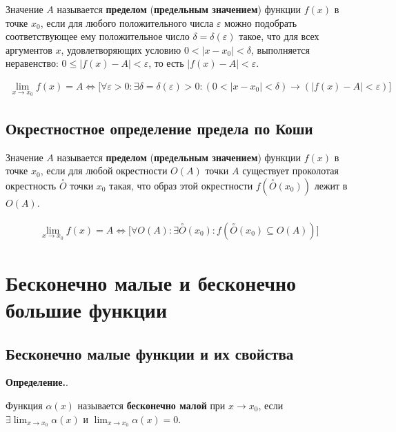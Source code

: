 \documentclass[a4paper,12pt]{extbook}
\newcommand{\newpar}{$ $\par\nobreak\ignorespaces}
\newenvironment{definition}[1][]{\noindent\textbf{Определение.}\if\relax\detokenize{#1}\relax\else\;#1.\newpar\fi\;}{\bigskip}
\theoremstyle{numbered}
\theoremstyle{named}
\theoremstyle{named}
\theoremstyle{named}
\begin{document}
Значение \(A\) называется \textbf{пределом} (\textbf{предельным значением}) функции \(f(x)\) в точке \(x_0\), если для любого положительного числа \(\varepsilon\) можно подобрать соответствующее ему положительное число \(\delta = \delta (\varepsilon)\) такое, что для всех аргументов \(x\), удовлетворяющих условию \(0 < |x - x_0| < \delta\), выполняется неравенство: \(0 \leq |f(x) - A| < \varepsilon\), то есть \(|f(x) -A| < \varepsilon\).

\begin{gather*}
    \lim_{x \to x_0}{f(x)} = A \iff \Big[ \forall \varepsilon > 0: \exists \delta = \delta (\varepsilon) > 0: (0 < |x - x_0| < \delta) \to (|f(x) - A| < \varepsilon) \Big]
\end{gather*}

\subsection*{Окрестностное определение предела по Коши}
Значение \(A\) называется \textbf{пределом} (\textbf{предельным значением}) функции \(f(x)\) в точке \(x_0\), если для любой окрестности \(O(A)\) точки \(A\) существует проколотая окрестность \(\overset{\circ}{O}\) точки \(x_0\) такая, что образ этой окрестности \(f(\overset{\circ}{O}(x_0))\) лежит в \(O(A)\).

\begin{gather*}
    \lim_{x \to x_0}{f(x)} = A \iff \Big[ \forall O(A): \exists \overset{\circ}{O}(x_0): f(\overset{\circ}{O}(x_0) \subseteq O(A)) \Big]
\end{gather*}

\section{Бесконечно малые и бесконечно большие функции}%
\label{sec:Бесконечно малые функции и их свойства}

\subsection*{Бесконечно малые функции и их свойства}%
\label{sub:Бесконечно малые функции и их свойства}

\begin{definition}
    Функция \(\alpha(x)\) называется \textbf{бесконечно малой} при \(x \to x_0\), если \(\displaystyle \exists \lim_{x \to x_0}{\alpha(x)}\) и \(\displaystyle \lim_{x \to x_0}{\alpha(x)} = 0\).
\end{definition}
\end{document}
